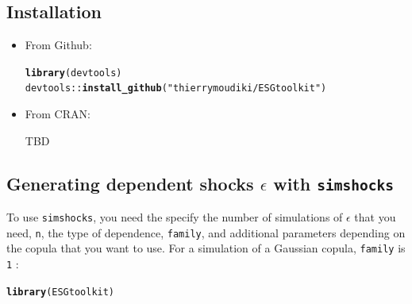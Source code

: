 \documentclass[a4paper]{article}\usepackage[]{graphicx}\usepackage[]{color}
\makeatletter
\newcommand{\hlstr}[1]{\textcolor[rgb]{0.192,0.494,0.8}{#1}}%
\newcommand{\hlopt}[1]{\textcolor[rgb]{0,0,0}{#1}}%
\newcommand{\hlstd}[1]{\textcolor[rgb]{0.345,0.345,0.345}{#1}}%
\newcommand{\hlkwd}[1]{\textcolor[rgb]{0.737,0.353,0.396}{\textbf{#1}}}%
\newenvironment{kframe}{%
 \def\at@end@of@kframe{}%
 \ifinner\ifhmode%
  \def\at@end@of@kframe{\end{minipage}}%
  \begin{minipage}{\columnwidth}%
 \fi\fi%
 \def\FrameCommand##1{\hskip\@totalleftmargin \hskip-\fboxsep
 \colorbox{shadecolor}{##1}\hskip-\fboxsep
     \hskip-\linewidth \hskip-\@totalleftmargin \hskip\columnwidth}%
 \MakeFramed {\advance\hsize-\width
   \@totalleftmargin\z@ \linewidth\hsize
   \@setminipage}}%
 {\par\unskip\endMakeFramed%
 \at@end@of@kframe}
\newenvironment{knitrout}{}{} %
\newcommand{\code}[1]{\mbox{\texttt{#1}}}
\makeatother
\begin{document}
\subsection{Installation}
\label{sec:installation}

\begin{itemize}
\item From Github: 

\begin{knitrout}
\color{fgcolor}\begin{kframe}
\begin{alltt}
\hlkwd{library}\hlstd{(devtools)}
\hlstd{devtools}\hlopt{::}\hlkwd{install_github}\hlstd{(}\hlstr{"thierrymoudiki/ESGtoolkit"}\hlstd{)}
\end{alltt}
\end{kframe}
\end{knitrout}

\item From CRAN: 

TBD

\end{itemize}


\subsection{Generating dependent shocks $\epsilon$ with \code{simshocks}}
\label{sec:exampleshocks}

To use \code{simshocks}, you need the specify the number of simulations of $\epsilon$ that you need, \code{n}, the type of dependence, \code{family}, and additional parameters depending on the copula that you want to use. For a simulation of a Gaussian copula, \code{family} is \code{1} : 

\begin{knitrout}
\color{fgcolor}\begin{kframe}
\begin{alltt}
\hlkwd{library}\hlstd{(ESGtoolkit)}
\end{alltt}
\end{kframe}
\end{knitrout}
\end{document}

